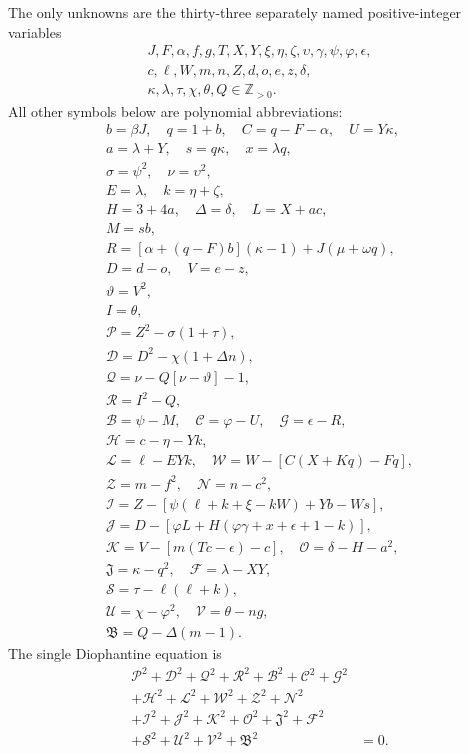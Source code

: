 The only unknowns are the thirty-three separately named positive-integer variables
\[
\begin{gathered}J,F,\alpha,f,g,T,X,Y,\xi,\eta,\zeta,\upsilon,\gamma,\psi,\varphi,\epsilon,\\
c,\ell,W,m,n,Z,d,o,e,z,\delta,\\
\kappa,\lambda,\tau,\chi,\theta,Q\in\mathbb Z_{>0}.\end{gathered}
\]
All other symbols below are polynomial abbreviations:
\[
\begin{gathered}
b=\beta J,\quad q=1+b,\quad C=q-F-\alpha,\quad U=Y\kappa,\\
a=\lambda+Y,\quad s=q\kappa,\quad x=\lambda q,\\
\sigma=\psi^2,\quad\nu=\upsilon^2,\\
E=\lambda,\quad k=\eta+\zeta,\\
H=3+4a,\quad\Delta=\delta,\quad L=X+ac,\\
M=sb,\\
R=[\alpha+(q-F)b](\kappa-1)+J(\mu+\omega q),\\
D=d-o,\quad V=e-z,\\
\vartheta=V^2,\\
I=\theta,\\
\mathcal{P}=Z^2-\sigma(1+\tau),\\
\mathcal{D}=D^2-\chi(1+\Delta n),\\
\mathcal{Q}=\nu-Q[\nu-\vartheta]-1,\\
\mathcal{R}=I^2-Q,\\
\mathcal{B}=\psi-M,\quad \mathcal{C}=\varphi-U,\quad \mathcal{G}=\epsilon-R,\\
\mathcal{H}=c-\eta-Yk,\\
\mathcal{L}=\ell-EYk,\quad \mathcal{W}=W-[C(X+Kq)-Fq],\\
\mathcal{Z}=m-f^2,\quad \mathcal{N}=n-c^2,\\
\mathcal{I}=Z-[\psi(\ell+k+\xi-kW)+Yb-Ws],\\
\mathcal{J}=D-[\varphi L+H(\varphi\gamma+x+\epsilon+1-k)],\\
\mathcal{K}=V-[m(Tc-\epsilon)-c],\quad\mathcal{O}=\delta-H-a^2,\\
\mathfrak{J}=\kappa-q^2,\quad\mathcal{F}=\lambda-XY,\\
\mathcal{S}=\tau-\ell(\ell+k),\\
\mathcal{U}=\chi-\varphi^2,\quad\mathcal{V}=\theta-ng,\\
\mathfrak{B}=Q-\Delta(m-1).
\end{gathered}
\]
The single Diophantine equation is
\[
\begin{split}
\mathcal{P}^2+\mathcal{D}^2+\mathcal{Q}^2+\mathcal{R}^2+\mathcal{B}^2+\mathcal{C}^2+\mathcal{G}^2 &\\
+\mathcal{H}^2+\mathcal{L}^2+\mathcal{W}^2+\mathcal{Z}^2+\mathcal{N}^2 &\\
+\mathcal{I}^2+\mathcal{J}^2+\mathcal{K}^2+\mathcal{O}^2+\mathfrak{J}^2+\mathcal{F}^2 &\\
+\mathcal{S}^2+\mathcal{U}^2+\mathcal{V}^2+\mathfrak{B}^2 &= 0.
\end{split}
\]
